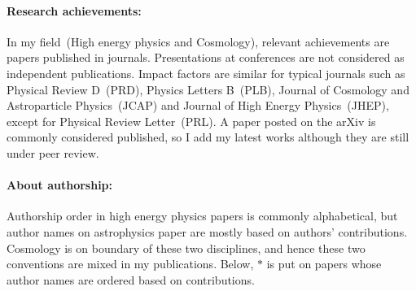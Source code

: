 \documentclass[a4paper]{resume} %
\begin{document}
\paragraph{Research achievements:}
In my field~(High energy physics and Cosmology), relevant achievements are papers published in journals.
Presentations at conferences are not considered as independent publications.
Impact factors are similar for typical journals such as Physical Review D~(PRD), Physics Letters B~(PLB), Journal of Cosmology and Astroparticle Physics~(JCAP) and Journal of High Energy Physics~(JHEP), except for Physical Review Letter~(PRL). 
A paper posted on the arXiv is commonly considered published, so I add my latest works although they are still under peer review.
\paragraph{About authorship:}
Authorship order in high energy physics papers is commonly alphabetical, but author names on astrophysics paper are mostly based on authors' contributions. 
Cosmology is on boundary of these two disciplines, and hence these two conventions are mixed in my publications.  
Below, $*$ is put on papers whose author names are ordered based on contributions. 
\end{document}
